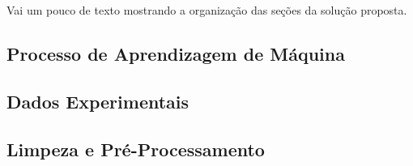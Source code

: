 Vai um pouco de texto mostrando a organização das seções da solução proposta.

\subsection{Processo de Aprendizagem de Máquina} \label{subsec:tarefa}


\subsection{Dados Experimentais} \label{subsec:dados}


\subsection{Limpeza e Pré-Processamento} \label{subsec:pre-process}


%

